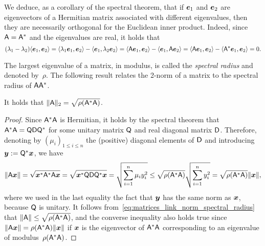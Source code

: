 We deduce, as a corollary of the spectral theorem,
that if $\mathbf{\boldsymbol{e}}_1$ and $\mathbf{\boldsymbol{e}}_2$ are eigenvectors of a Hermitian matrix associated with different eigenvalues,
then they are necessarily orthogonal for the Euclidean inner product.
Indeed, since $\mathsf A = \mathsf A^*$ and the eigenvalues are real, it holds that
\[
    (\lambda_1 - \lambda_2) \langle\mathbf{\boldsymbol{e}}_1, \mathbf{\boldsymbol{e}}_2\rangle
    = \langle\lambda_1 \mathbf{\boldsymbol{e}}_1, \mathbf{\boldsymbol{e}}_2\rangle - \langle\mathbf{\boldsymbol{e}}_1, \lambda_2 \mathbf{\boldsymbol{e}}_2\rangle
    = \langle\mathsf A \mathbf{\boldsymbol{e}}_1, \mathbf{\boldsymbol{e}}_2\rangle - \langle\mathbf{\boldsymbol{e}}_1, \mathsf A \mathbf{\boldsymbol{e}}_2\rangle
    = \langle\mathsf A \mathbf{\boldsymbol{e}}_1, \mathbf{\boldsymbol{e}}_2\rangle - \langle\mathsf A^* \mathbf{\boldsymbol{e}}_1, \mathbf{\boldsymbol{e}}_2\rangle = 0.
\]

The largest eigenvalue of a matrix, in modulus,
is called the \emph{spectral radius} and denoted by~$\rho$.
The following result relates the 2-norm of a matrix to the spectral radius of $\mathsf A \mathsf A^*$.
\begin{proposition}
    It holds that $\lVert\mathsf A\rVert_2 = \sqrt{\rho(\mathsf A^* \mathsf A)}$.
\end{proposition}
\begin{proof}
    Since $\mathsf A^* \mathsf A$ is Hermitian,
    it holds by the spectral theorem that $\mathsf A^* \mathsf A = \mathsf Q \mathsf D \mathsf Q^*$ for some unitary matrix $\mathsf Q$ and real diagonal matrix $\mathsf D$.
    Therefore, denoting by $(\mu_i)_{1 \leq i \leq n}$ the (positive) diagonal elements of $\mathsf D$
    and introducing $\mathbf{\boldsymbol{y}} := \mathsf Q^* \mathbf{\boldsymbol{x}}$,
    we have
    \begin{equation}
        \label{eq:matrices_link_norm_spectral_radius}
        \lVert\mathsf A \mathbf{\boldsymbol{x}}\rVert
        = \sqrt{\mathbf{\boldsymbol{x}}^* \mathsf A^* \mathsf A \mathbf{\boldsymbol{x}}}
        = \sqrt{\mathbf{\boldsymbol{x}}^* \mathsf Q \mathsf D \mathsf Q^* \mathbf{\boldsymbol{x}}}
        = \sqrt{\sum_{i=1}^{n} \mu_i y_i^2}
        \leq \sqrt{\rho(\mathsf A^* \mathsf A)} \sqrt{\sum_{i=1}^{n} y_i^2}
        =  \sqrt{\rho(\mathsf A^* \mathsf A)} \lVert\mathbf{\boldsymbol{x}}\rVert,
    \end{equation}
    where we used in the last equality the fact that $\mathbf{\boldsymbol{y}}$ has the same norm as $\mathbf{\boldsymbol{x}}$,
    because $\mathsf Q$ is unitary.
    It follows from~\eqref{eq:matrices_link_norm_spectral_radius} that $\lVert\mathsf A\rVert \leq \sqrt{\rho(\mathsf A^* \mathsf A)}$,
    and the converse inequality also holds true since $\lVert\mathsf A \mathbf{\boldsymbol{x}}\rVert = \rho(\mathsf A^* \mathsf A) \lVert\mathbf{\boldsymbol{x}}\rVert$
    if $\mathbf{\boldsymbol{x}}$ is the eigenvector of $\mathsf A^* \mathsf A$ corresponding to an eigenvalue of modulus~$\rho(\mathsf A^* \mathsf A)$.
\end{proof}

